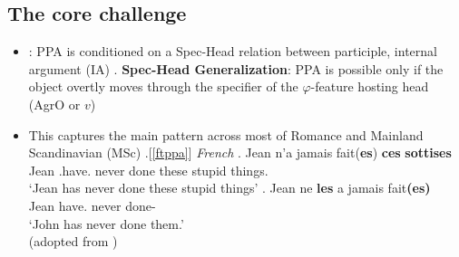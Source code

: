 \documentclass[letterpaper,10pt]{handout_nick}
\begin{document}
\subsection{The core challenge}
\begin{itemize}
\item \citet{kayne89b}: PPA is conditioned on a Spec-Head relation between participle, internal argument (IA)
\ex.\label{shg} {\bf Spec-Head Generalization}: PPA is possible only if the object overtly moves through the specifier of the $\varphi$-feature hosting head (AgrO or $v$) 

\item This captures the main pattern across most of Romance and Mainland Scandinavian (MSc)
\ex.[\ref{ftppa}] \emph{French} \ag. Jean n'a jamais fait({\bf *es}) {\bf ces} {\bf sottises}\\
Jean .have. never done these {stupid things}.\\
`Jean has never done these stupid things'
\bg. Jean ne {\bf les} a jamais fait{\bf (es)}\\
Jean   have. never done-\\
`John has never done them.'\\
(adopted from \citealt{belletti06})


\end{itemize}
\end{document}
